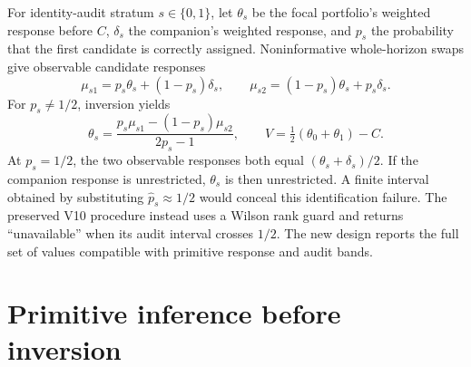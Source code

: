 \documentclass[11pt,a4paper]{article}
\begin{document}
For identity-audit stratum $s\in\{0,1\}$, let $\theta_s$ be the focal
portfolio's weighted response before $C$, $\delta_s$ the companion's weighted
response, and $p_s$ the probability that the first candidate is correctly
assigned. Noninformative whole-horizon swaps give observable candidate
responses
\begin{equation}\label{eq:mixture}
 \mu_{s1}=p_s\theta_s+(1-p_s)\delta_s,\qquad
 \mu_{s2}=(1-p_s)\theta_s+p_s\delta_s.
\end{equation}
For $p_s\ne 1/2$, inversion yields
\begin{equation}\label{eq:inverse}
 \theta_s=\frac{p_s\mu_{s1}-(1-p_s)\mu_{s2}}{2p_s-1},\qquad
 V=\tfrac12(\theta_0+\theta_1)-C.
\end{equation}
At $p_s=1/2$, the two observable responses both equal
$(\theta_s+\delta_s)/2$. If the companion response is unrestricted,
$\theta_s$ is then unrestricted. A finite interval obtained by substituting
$\widehat p_s\approx1/2$ would conceal this identification failure. The
preserved V10 procedure instead uses a Wilson rank guard and returns
``unavailable'' when its audit interval crosses $1/2$. The new design reports
the full set of values compatible with primitive response and audit bands.

\section{Primitive inference before inversion}
\end{document}
